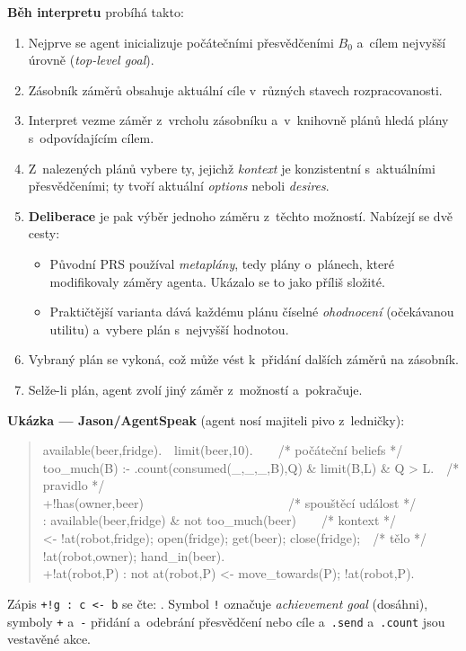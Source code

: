 \documentclass[11pt,a4paper]{article}
\theoremstyle{definition}
\begin{document}
\textbf{Běh interpretu} probíhá takto:
\begin{enumerate}
\item Nejprve se agent inicializuje počátečními přesvědčeními $B_0$ a~cílem nejvyšší úrovně
  (\emph{top-level goal}).
\item Zásobník záměrů obsahuje aktuální cíle v~různých stavech rozpracovanosti.
\item Interpret vezme záměr z~vrcholu zásobníku a~v~knihovně plánů hledá plány s~odpovídajícím
  cílem.
\item Z~nalezených plánů vybere ty, jejichž \emph{kontext} je konzistentní s~aktuálními
  přesvědčeními; ty tvoří aktuální \emph{options} neboli \emph{desires}.
\item \textbf{Deliberace} je pak výběr jednoho záměru z~těchto možností. Nabízejí se dvě cesty:
  \begin{itemize}
  \item Původní PRS používal \emph{metaplány}, tedy plány o~plánech, které modifikovaly záměry
    agenta. Ukázalo se to jako příliš složité.
  \item Praktičtější varianta dává každému plánu číselné \emph{ohodnocení} (očekávanou utilitu)
    a~vybere plán s~nejvyšší hodnotou.
  \end{itemize}
\item Vybraný plán se vykoná, což může vést k~přidání dalších záměrů na zásobník.
\item Selže-li plán, agent zvolí jiný záměr z~možností a~pokračuje.
\end{enumerate}

\medskip
\noindent\textbf{Ukázka --- Jason/AgentSpeak} (agent nosí majiteli pivo z~ledničky):
\begin{quote}\small\ttfamily
\noindent available(beer,fridge).\ \ limit(beer,10).\ \ \ \ /* počáteční beliefs */\\
too\_much(B) :- .count(consumed(\_,\_,\_,B),Q) \& limit(B,L) \& Q > L.\ \ /* pravidlo */\\[0.3em]
+!has(owner,beer)\ \ \ \ \ \ \ \ \ \ \ \ \ \ \ \ \ \ \ \ \ \ \ /* spouštěcí událost */\\
\hspace*{1em}: available(beer,fridge) \& not too\_much(beer)\ \ \ \ /* kontext */\\
\hspace*{1em}<- !at(robot,fridge); open(fridge); get(beer); close(fridge);\ \ /* tělo */\\
\hspace*{2em} !at(robot,owner); hand\_in(beer).\\[0.3em]
+!at(robot,P) : not at(robot,P) <- move\_towards(P); !at(robot,P).
\end{quote}
Zápis \texttt{+!g : c <- b} se čte: . Symbol \texttt{!} označuje \emph{achievement goal}
(dosáhni), symboly \texttt{+} a~\texttt{-} přidání a~odebrání přesvědčení nebo cíle
a~\texttt{.send} a~\texttt{.count} jsou vestavěné akce.
\end{document}
